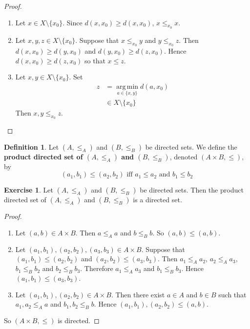 \documentclass[12pt]{amsart}
\theoremstyle{definition}
\newtheorem{defn}[definition]{Definition}
\newtheorem{ex}[definition]{Exercise}
\newcommand{\tbf}[1]{\textbf{#1}}
\DeclareMathOperator*{\argmin}{arg\,min}
\DeclareMathOperator*{\0}{\mbf{0}}
\DeclareMathOperator*{\1}{\mbf{1}}
\begin{document}
	\begin{proof}\
		\begin{enumerate}
			\item Let $x \in X \setminus \{x_0\}$. Since $d(x, x_0) \geq d(x, x_0)$, $x \leq_{x_0} x$.
			\item Let $x, y, z \in X \setminus \{x_0\}$. Suppose that $x \leq_{x_0} y$ and $y \leq_{x_0} z$. Then $d(x, x_0) \geq d(y, x_0)$ and $d(y, x_0) \geq d(z, x_0)$. Hence $d(x, x_0) \geq d(z, x_0)$ so that $x \leq z$.
			\item Let $x,y \in X \setminus \{x_0\}$. Set 
			\begin{align*}
				z 
				&= \argmin\limits_{a \in \{x, y\}} d(a, x_0) \\ 
				& \in X \setminus \{x_0\} 
			\end{align*}
			Then $x, y \leq_{x_0} z$.
		\end{enumerate}
	\end{proof}

	\begin{defn}
		Let $(A, \leq_A)$ and $(B, \leq_B)$ be directed sets. We define the \tbf{product directed set of $(A, \leq_A)$ and $(B, \leq_B)$}, denoted $(A \times B, \leq)$, by 
		$$(a_1, b_1) \leq (a_2, b_2) \text{ iff } a_1 \leq a_2 \text{ and } b_1 \leq b_2$$
	\end{defn}

	\begin{ex}
		Let $(A, \leq_A)$ and $(B, \leq_B)$ be directed sets. Then the product directed set of $(A, \leq_A)$ and $(B, \leq_B)$ is a directed set.
	\end{ex}

	\begin{proof}\
		\begin{enumerate}
			\item Let $(a, b) \in A \times B$. Then $a \leq_A a$ and $b \leq_B b$. So $(a, b) \leq (a ,b)$.
			\item Let $(a_1, b_1), (a_2, b_2), (a_3, b_3) \in A \times B$. Suppose that $(a_1, b_1) \leq (a_2, b_2)$ and $(a_2, b_2) \leq (a_3, b_3)$. Then $a_1 \leq_A a_2$, $a_2 \leq_A a_3$, $b_1 \leq_B b_2$ and $b_2 \leq_B b_3$. Therefore $a_1 \leq_A a_3$ and $b_1 \leq_B b_3$. Hence $(a_1, b_1) \leq (a_3, b_3)$.
			\item Let $(a_1, b_1), (a_2, b_2) \in A \times B$. Then there exist $a \in A$ and $b \in B$ such that $a_1, a_2 \leq_A a$ and $b_1, b_2 \leq_B b$. Hence $(a_1, b_1), (a_2, b_2) \leq (a, b)$.
		\end{enumerate}
		So $(A \times B, \leq)$ is directed.
	\end{proof}
	
\end{document}
